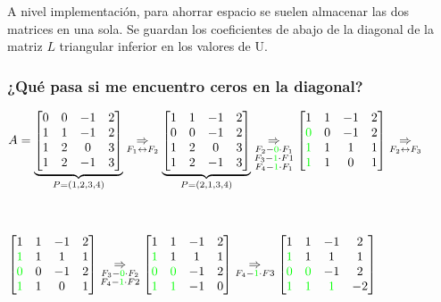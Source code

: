 \documentclass[]{article}
\begin{document}
A nivel implementación, para ahorrar espacio se suelen almacenar las dos matrices en una sola. Se guardan los coeficientes de abajo de la diagonal de la matriz $L$ triangular inferior en los valores de U.


\subsubsection{¿Qué pasa si me encuentro ceros en la diagonal?}
\begin{center}
	$A=\underbrace{\begin{bmatrix}
		0&0&-1&2\\
		1&1&-1&2\\
		1&2&0&3\\
		1&2&-1&3
	\end{bmatrix}}_{P=(1,2,3,4)}\underset{F_1 \leftrightarrow F_2}{\Rightarrow}
	\underbrace{\begin{bmatrix}
		1&1&-1&2\\
		0&0&-1&2\\
		1&2&0&3\\
		1&2&-1&3
	\end{bmatrix}}_{P=(2,1,3,4)}\underset{\substack{F_2-\mathbin{\color{green}{0}}\cdot F_1 \\ F_3 - \mathbin{\color{green}{1}}\cdot F1 \\ F_4 - \mathbin{\color{green}{1}}\cdot F_1}}{\Rightarrow}
	\begin{bmatrix}
		1&1&-1&2\\
		\mathbin{\color{green}{0}}&0&-1&2\\
		\mathbin{\color{green}{1}}&1&1&1\\
		\mathbin{\color{green}{1}}&1&0&1
	\end{bmatrix}\underset{F_2 \leftrightarrow F_3}{\Rightarrow}$

	~\newline

	$
	\begin{bmatrix}
		1&1&-1&2\\
		\mathbin{\color{green}{1}}&1&1&1\\
		\mathbin{\color{green}{0}}&0&-1&2\\
		\mathbin{\color{green}{1}}&1&0&1
	\end{bmatrix}\underset{\substack{F_3-\mathbin{\color{green}{0}}\cdot F_2 \\ F_4 - \mathbin{\color{green}{1}}\cdot F2}}{\Rightarrow}
	\begin{bmatrix}
		1&1&-1&2\\
		\mathbin{\color{green}{1}}&1&1&1\\
		\mathbin{\color{green}{0}}&\mathbin{\color{green}{0}}&-1&2\\
		\mathbin{\color{green}{1}}&\mathbin{\color{green}{1}}&-1&0
	\end{bmatrix}\underset{F_4-\mathbin{\color{green}{1}}\cdot F3}{\Rightarrow}
	\begin{bmatrix}
		1&1&-1&2\\
		\mathbin{\color{green}{1}}&1&1&1\\
		\mathbin{\color{green}{0}}&\mathbin{\color{green}{0}}&-1&2\\
		\mathbin{\color{green}{1}}&\mathbin{\color{green}{1}}&\mathbin{\color{green}{1}}&-2
	\end{bmatrix}$
\end{center}
\end{document}
